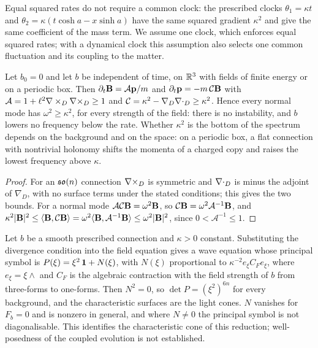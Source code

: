 Equal squared rates do not require a common clock: the prescribed clocks $\theta_1=\kappa t$ and $\theta_2=\kappa(t\cosh a-x\sinh a)$ have
the same squared gradient $\kappa^2$ and give the same coefficient of the mass term. We assume one clock, which enforces equal squared rates;
with a dynamical clock this assumption also selects one common fluctuation and its coupling to the matter.

\begin{proposition}
\label{prop:edge}
Let $b_0=0$ and let $b$ be independent of time, on $\mathbb{R}^3$ with fields of finite energy or on a periodic box. Then
$\partial_t\mathbf B=\mathcal A\mathbf p/m$ and $\partial_t\mathbf p=-m\,\mathcal C\mathbf B$ with $\mathcal A=1+\ell^2\nabla\times_D\nabla\times_D\ge1$ and
$\mathcal C=\kappa^2-\nabla_D\nabla\cdot_D\ge\kappa^2$. Hence every normal mode has $\omega^2\ge\kappa^2$, for every strength of the field: there
is no instability, and $b$ lowers no frequency below the rate. Whether $\kappa^2$ is the bottom of the spectrum depends on the background
and on the space: on a periodic box, a flat connection with nontrivial holonomy shifts the momenta of a charged copy and raises the lowest
frequency above $\kappa$.
\end{proposition}

\begin{proof}
For an $\mathfrak{so}(n)$ connection $\nabla\times_D$ is symmetric and $\nabla\cdot_D$ is minus the adjoint of $\nabla_D$, with no surface terms under the stated
conditions; this gives the two bounds. For a normal mode $\mathcal A\mathcal C\mathbf B=\omega^2\mathbf B$, so $\mathcal C\mathbf B=\omega^2\mathcal A^{-1}\mathbf B$,
and $\kappa^2|\mathbf B|^2\le\langle\mathbf B,\mathcal C\mathbf B\rangle=\omega^2\langle\mathbf B,\mathcal A^{-1}\mathbf B\rangle\le\omega^2|\mathbf B|^2$, since
$0<\mathcal A^{-1}\le1$.
\end{proof}

\begin{proposition}[Characteristics]
\label{prop:cone}
Let $b$ be a smooth prescribed connection and $\kappa>0$ constant. Substituting the divergence condition into the field equation gives a
wave equation whose principal symbol is $P(\xi)=\xi^2\,\mathbf 1+N(\xi)$, with $N(\xi)$ proportional to $\kappa^{-2}e_\xi C_Fe_\xi$, where
$e_\xi=\xi\wedge$ and $C_F$ is the algebraic contraction with the field strength of $b$ from three-forms to one-forms. Then $N^2=0$, so
$\det P=(\xi^2)^{6n}$ for every background, and the characteristic surfaces are the light cones. $N$ vanishes for $F_b=0$ and is nonzero
in general, and where $N\ne0$ the principal symbol is not diagonalisable. This identifies the characteristic cone of this reduction;
well-posedness of the coupled evolution is not established.
\end{proposition}

